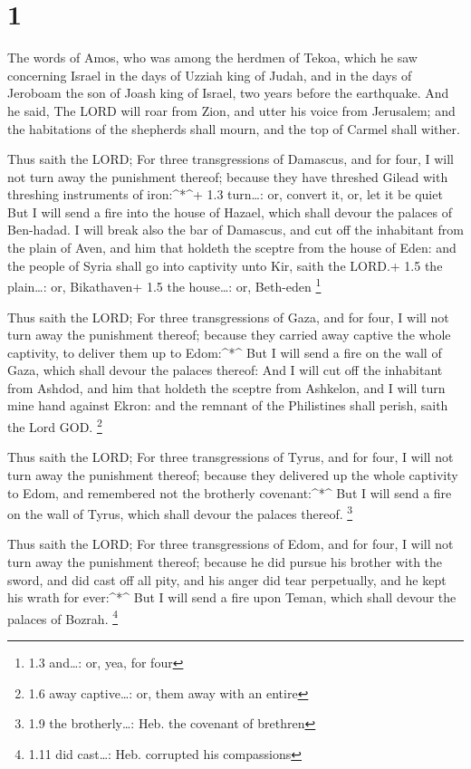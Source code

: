 \hypertarget{section}{%
\section{1}\label{section}}

 The words of Amos, who was among the herdmen of Tekoa,
which he saw concerning Israel in the days of Uzziah king of Judah, and
in the days of Jeroboam the son of Joash king of Israel, two years
before the earthquake.  And he said, The LORD will roar from
Zion, and utter his voice from Jerusalem; and the habitations of the
shepherds shall mourn, and the top of Carmel shall wither.

 Thus saith the LORD; For three transgressions of Damascus,
and for four, I will not turn away the punishment thereof; because they
have threshed Gilead with threshing instruments of iron:\^{}*\^{}+ 1.3
turn\ldots: or, convert it, or, let it be quiet  But I will
send a fire into the house of Hazael, which shall devour the palaces of
Ben-hadad.  I will break also the bar of Damascus, and cut
off the inhabitant from the plain of Aven, and him that holdeth the
sceptre from the house of Eden: and the people of Syria shall go into
captivity unto Kir, saith the LORD.+ 1.5 the plain\ldots: or,
Bikathaven+ 1.5 the house\ldots: or, Beth-eden \footnote{1.3 and\ldots:
  or, yea, for four}

 Thus saith the LORD; For three transgressions of Gaza, and
for four, I will not turn away the punishment thereof; because they
carried away captive the whole captivity, to deliver them up to
Edom:\^{}*\^{}  But I will send a fire on the wall of Gaza,
which shall devour the palaces thereof:  And I will cut off
the inhabitant from Ashdod, and him that holdeth the sceptre from
Ashkelon, and I will turn mine hand against Ekron: and the remnant of
the Philistines shall perish, saith the Lord GOD. \footnote{1.6 away
  captive\ldots: or, them away with an entire}

 Thus saith the LORD; For three transgressions of Tyrus, and
for four, I will not turn away the punishment thereof; because they
delivered up the whole captivity to Edom, and remembered not the
brotherly covenant:\^{}*\^{}  But I will send a fire on the
wall of Tyrus, which shall devour the palaces thereof. \footnote{1.9 the
  brotherly\ldots: Heb. the covenant of brethren}

 Thus saith the LORD; For three transgressions of Edom, and
for four, I will not turn away the punishment thereof; because he did
pursue his brother with the sword, and did cast off all pity, and his
anger did tear perpetually, and he kept his wrath for ever:\^{}*\^{}
 But I will send a fire upon Teman, which shall devour the
palaces of Bozrah. \footnote{1.11 did cast\ldots: Heb. corrupted his
  compassions}

